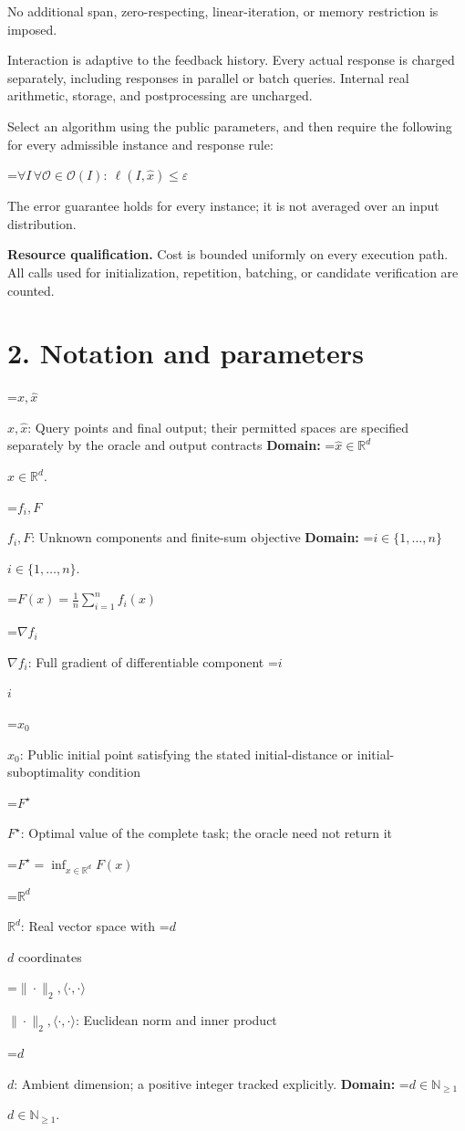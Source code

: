 \documentclass[10pt,a4paper]{article}
\newcommand{\AtlasMath}[1]{\par\begingroup\centering\setbox0=\hbox{$\displaystyle #1$}\ifdim\wd0>1.4\linewidth\typeout{ATLAS WIDE FORMULA: \the\wd0}\fi\ifdim\wd0>\linewidth\resizebox{\linewidth}{!}{\box0}\else\box0\fi\par\endgroup}
\newcommand{\AtlasInlineMath}[1]{\begingroup\setbox0=\hbox{$#1$}\ifdim\wd0>.4\linewidth\endgroup\AtlasMath{#1}\else\endgroup$#1$\fi}
\begin{document}
No additional span, zero-respecting, linear-iteration, or memory restriction is imposed.

Interaction is adaptive to the feedback history. Every actual response is charged separately, including responses in parallel or batch queries. Internal real arithmetic, storage, and postprocessing are uncharged.

Select an algorithm using the public parameters, and then require the following for every admissible instance and response rule:


\AtlasMath{\forall I\,\forall\mathcal{O}\in\mathcal{O}(I):\ \ell(I,\widehat{x})\le\varepsilon}


The error guarantee holds for every instance; it is not averaged over an input distribution.

\textbf{Resource qualification.} Cost is bounded uniformly on every execution path. All calls used for initialization, repetition, batching, or candidate verification are counted.

\section{2. Notation and parameters}
\AtlasInlineMath{x,\widehat{x}}: Query points and final output; their permitted spaces are specified separately by the oracle and output contracts \textbf{Domain:} \AtlasInlineMath{\widehat{x}\in \mathbb{R}^d}.

\AtlasInlineMath{f_i,F}: Unknown components and finite-sum objective \textbf{Domain:} \AtlasInlineMath{i\in\{1,\ldots,n\}}.


\AtlasMath{F(x)=\frac1n\sum_{i=1}^n f_i(x)}


\AtlasInlineMath{\nabla f_i}: Full gradient of differentiable component \AtlasInlineMath{i}

\AtlasInlineMath{x_0}: Public initial point satisfying the stated initial-distance or initial-suboptimality condition

\AtlasInlineMath{F^\star}: Optimal value of the complete task; the oracle need not return it


\AtlasMath{F^\star=\inf_{x\in \mathbb{R}^d}F(x)}


\AtlasInlineMath{\mathbb{R}^d}: Real vector space with \AtlasInlineMath{d} coordinates

\AtlasInlineMath{\|\cdot\|_2,\langle\cdot,\cdot\rangle}: Euclidean norm and inner product

\AtlasInlineMath{d}: Ambient dimension; a positive integer tracked explicitly. \textbf{Domain:} \AtlasInlineMath{d\in\mathbb{N}_{\ge1}}.
\end{document}
